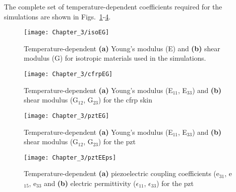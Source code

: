 The complete set of temperature-dependent coefficients required for the simulations are shown in Figs.~\ref{fig:isoEG}-\ref{fig:pztEEps}.
\begin{figure}
	\begin{center}
		\texttt{[image: Chapter\_3/isoEG]}
	\end{center}
	\caption{Temperature-dependent \textbf{(a)} Young's modulus (E) and \textbf{(b)} shear modulus (G) for isotropic materials used in the simulations.}
	\label{fig:isoEG}
\end{figure}
\begin{figure}
	\begin{center}
		\texttt{[image: Chapter\_3/cfrpEG]}
	\end{center}
	\caption{Temperature-dependent \textbf{(a)} Young's modulus (E\(_{11}\), E\(_{33}\)) and \textbf{(b)} shear modulus (G\(_{12}\), G\(_{23}\)) for the \acf{cfrp} skin}
	\label{fig:cfrpEG}
\end{figure}
\begin{figure}
	\begin{center}
		\texttt{[image: Chapter\_3/pztEG]}
	\end{center}
	\caption{Temperature-dependent \textbf{(a)} Young's modulus (E\(_{11}\), E\(_{33}\)) and \textbf{(b)} shear modulus (G\(_{12}\), G\(_{23}\)) for the \acf{pzt}}
	\label{fig:pztEG}
\end{figure}
\begin{figure}
	\begin{center}
		\texttt{[image: Chapter\_3/pztEEps]}
	\end{center}
	\caption{Temperature-dependent \textbf{(a)} piezoelectric coupling coefficients (e\(_{31}\), e\(_{15}\), e\(_{33}\) and \textbf{(b)} electric permittivity (\(\epsilon_{11}\), \(\epsilon_{33}\)) for the \acf{pzt}}
	\label{fig:pztEEps}
\end{figure}


